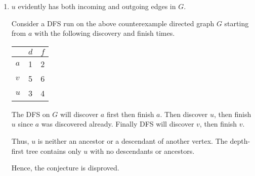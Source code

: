 \documentclass[a4paper]{report}
\begin{document}
\begin{enumerate}
    \item

      $u$ evidently has both incoming and outgoing edges in $G$.

      Consider a DFS run on the above counterexample directed graph $G$ starting from $a$ with the 
      following discovery and finish times.  

      \begin{center}
        \begin{tabular}{ l | c | r }
          \hline
            & $d$ & $f$ \\ \hline
          $a$ & 1 & 2 \\
          $v$ & 5 & 6 \\
          $u$ & 3 & 4 \\
          \hline  
        \end{tabular}
      \end{center}


      The DFS on $G$ will discover $a$ first then finish $a$. Then discover $u$, then finish $u$ since
      $a$ was discovered already. Finally DFS will discover $v$, then finish $v$.

      Thus, $u$ is neither an ancestor or a descendant of another vertex. The depth-first tree
      contains only $u$ with no descendants or ancestors. 

      Hence, the conjecture is disproved.

    \par
    \bigskip






  \end{enumerate}
\end{document}
